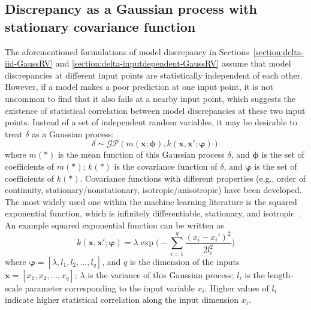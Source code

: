 \documentclass[preprint,review,12pt,3p]{elsarticle}
\begin{document}
\subsection{Discrepancy as a Gaussian process with stationary covariance function}\label{section:stationaryGP}
The aforementioned formulations of model discrepancy in Sections~\ref{section:delta-iid-GaussRV} and \ref{section:delta-inputdependent-GaussRV} assume that model discrepancies at different input points are statistically independent of each other. However, if a model makes a poor prediction at one input point, it is not uncommon to find that it also fails at a nearby input point, which suggests the existence of statistical correlation between model discrepancies at these two input points. Instead of a set of independent random variables, it may be desirable to treat $\delta$ as a Gaussian process:
\begin{equation}
\delta \sim \mathcal{GP} (m(\boldsymbol{x};\boldsymbol{\phi}), k(\boldsymbol{x}, \boldsymbol{x}';\boldsymbol{\varphi}))
\end{equation}
where $m(*)$ is the mean function of this Gaussian process $\delta$, and $\boldsymbol{\phi}$ is the set of coefficients of $m(*)$; $k(*)$ is the covariance function of $\delta$, and $\boldsymbol{\varphi}$ is the set of coefficients of $k(*)$. Covariance functions with different properties (e.g., order of continuity, stationary/nonstationary, isotropic/anisotropic) have been developed. The most widely used one within the machine learning literature is the squared exponential function, which is infinitely differentiable, stationary, and isotropic~\citep{Rasmussen2006}. An example squared exponential function can be written as
\begin{equation}\label{eq:sqExpCovFun}
k(\boldsymbol{x},\boldsymbol{x'};\boldsymbol{\varphi}) = \lambda \exp \Big( -\sum_{i=1}^q \frac{(x_i - x_i')^2}{2 l_i^2} \Big)
\end{equation}
where $\boldsymbol{\varphi}=[\lambda,l_1,l_2,...,l_q]$, and $q$ is the dimension of the inputs $\boldsymbol{x}=[x_1,x_2,...,x_q]$; $\lambda$ is the variance of this Gaussian process; $l_i$ is the length-scale parameter corresponding to the input variable $x_i$. Higher values of $l_i$ indicate higher statistical correlation along the input dimension $x_i$. 
\end{document}

